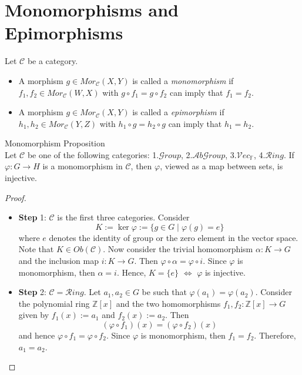 \section{Monomorphisms and Epimorphisms}

\begin{definition}
    Let $\mathcal{C}$ be a category.
    \begin{itemize}
        \item A morphism $g \in Mor_\mathcal{C}(X,Y)$ is called a \textit{monomorphism} if $f_1,f_2 \in Mor_\mathcal{C} (W,X)$ with $g \circ f_1 = g\circ f_2$ can imply that $f_1=f_2$.
        \item A morphism $g \in Mor_\mathcal{C}(X,Y)$ is called a \textit{epimorphism} if $h_1,h_2 \in Mor_\mathcal{C}(Y,Z)$ with $h_1 \circ g= h_2 \circ g$ can imply that $h_1=h_2$.
    \end{itemize}
\end{definition}

\begin{proposition}{Monomorphism Proposition}\\
Let $\mathcal{C}$ be one of the following categories: 1.$\mathcal{G}roup$, 2.$\mathcal{A}b\mathcal{G}roup$, 3.$\mathcal{V}ec_\mathbb{F}$, 4.$\mathcal{R}ing$. If $\varphi: G\to H$ is a monomorphism in $\mathcal{C}$, then $\varphi$, viewed as a map between sets, is injective.
\end{proposition}

\begin{proof}
    \begin{itemize}
        \item \textbf{Step} 1: $\mathcal{C}$ is the first three categories. Consider $$K:= \ker \varphi := \{ g \in G \mid \varphi (g) =e \}$$
        where $e$ denotes the identity of group or the zero element in the vector space. Note that $K \in Ob(\mathcal{C})$. Now consider the trivial homomorphism $\alpha: K \to G$ and the inclusion map $i: K \to G$. Then $\varphi \circ \alpha = \varphi \circ i$. Since $\varphi$ is monomorphism, then $\alpha= i$. Hence, $K = \{e\}$ $\Leftrightarrow$ $\varphi$ is injective.

        \item \textbf{Step} 2: $\mathcal{C} = \mathcal{R}ing$. Let $a_1,a_2 \in G$ be such that $\varphi (a_1) = \varphi (a_2)$. Consider the polynomial ring $\mathbb{Z}[x]$ and the two homomorphisms $f_1,f_2: \mathbb{Z}[x] \to G$ given by $f_1(x) := a_1$ and $f_2(x) := a_2$. Then 
        $$(\varphi \circ f_1)(x) = (\varphi \circ f_2)(x)$$
        and hence $\varphi \circ f_1 = \varphi \circ f_2$. Since $\varphi$ is monomorphism, then $f_1 = f_2$. Therefore, $a_1 = a_2$.
    \end{itemize}
\end{proof}

